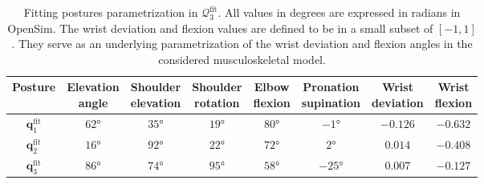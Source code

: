 \begin{table}[!ht]
    \centering
    \begin{tabular}{|c||c|c|c|c|c|c|c|}
    \hline
    Posture & \makecell{Elevation \\ angle} & \makecell{Shoulder \\ elevation} & \makecell{Shoulder \\ rotation} & \makecell{Elbow \\flexion} & \makecell{Pronation \\ supination} & \makecell{Wrist \\ deviation} & \makecell{Wrist \\ flexion} \\
    \hline
    $\mathbf{q}_1^{\text{fit}}$ & $62$° & $35$° & $19$° & $80$° & $-1$° & $-0.126$ & $-0.632$ \\
    $\mathbf{q}_2^{\text{fit}}$ & $16$° & $92$° & $22$° & $72$° & $2$° & $0.014$ & $-0.408$ \\
    $\mathbf{q}_3^{\text{fit}}$ & $86$° & $74$° & $95$° & $58$° & $-25$° & $0.007$ & $-0.127$ \\
    \hline
    \end{tabular}
    \caption{Fitting postures parametrization in $\mathcal{Q}_3^{\text{fit}}$. All values in degrees are expressed in radians in OpenSim. The wrist deviation and flexion values are defined to be in a small subset of $[-1,1]$. They serve as an underlying parametrization of the wrist deviation and flexion angles in the considered musculoskeletal model.}
    \label{tab:postures_fit_3_value}
\end{table}

